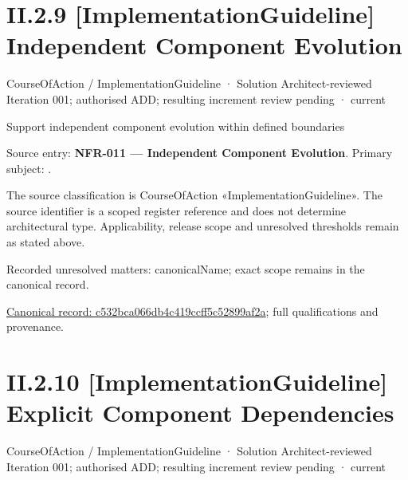\section*{II.2.9 [ImplementationGuideline] Independent Component Evolution}
\label{navigation:II.2.9}

\label{element:c532bca066db4c419ccff5c52899af2a}
{\small CourseOfAction / ImplementationGuideline · Solution Architect-reviewed Iteration 001; authorised ADD; resulting increment review pending · current}\par

Support independent component evolution within defined boundaries



Source entry: \textbf{NFR-011 — Independent Component Evolution}. Primary subject: \texttt{}.



The source classification is CourseOfAction «ImplementationGuideline». The source identifier is a scoped register reference and does not determine architectural type. Applicability, release scope and unresolved thresholds remain as stated above.


{\small Recorded unresolved matters: canonicalName; exact scope remains in the canonical record.}\par
{\footnotesize \href{../../../../continuum/strategy/course-of-action/implementation-guideline/c532bca066db4c419ccff5c52899af2a.md}{Canonical record: c532bca066db4c419ccff5c52899af2a}; full qualifications and provenance.}\par
\section*{II.2.10 [ImplementationGuideline] Explicit Component Dependencies}
\label{navigation:II.2.10}

\label{element:2c21d1a175fb4c1486f6a91830838cde}
{\small CourseOfAction / ImplementationGuideline · Solution Architect-reviewed Iteration 001; authorised ADD; resulting increment review pending · current}\par

